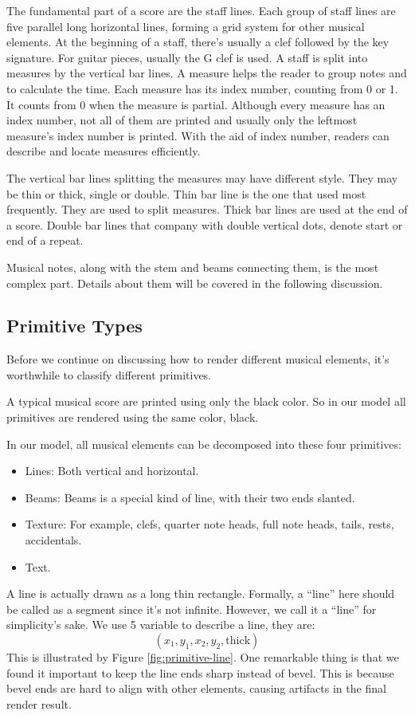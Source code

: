 The fundamental part of a score are the staff lines. Each group of staff lines are five parallel long horizontal lines, forming a grid system for other musical elements. At the beginning of a staff, there's usually a clef followed by the key signature. For guitar pieces, usually the G clef is used. 
A staff is split into measures by the vertical bar lines. A measure helps the reader to group notes and to calculate the time. Each measure has its index number, counting from 0 or 1. It counts from 0 when the measure is partial. Although every measure has an index number, not all of them are printed and usually only the leftmost measure's index number is printed. With the aid of index number, readers can describe and locate measures efficiently. 

The vertical bar lines splitting the measures may have different style. They may be thin or thick, single or double. Thin bar line is the one that used most frequently. They are used to split measures.
 Thick bar lines are used at the end of a score. Double bar lines that company with double vertical dots, denote start or end of a repeat.

 Musical notes, along with the stem and beams connecting them, is the most complex part. Details about them will be covered in the following discussion.

\subsection{Primitive Types}
Before we continue on discussing how to render different musical elements, it's worthwhile to classify different primitives.

A typical musical score are printed using only the black color.
So in our model all primitives are rendered using the same color, black.

In our model, all musical elements can be decomposed into these four primitives:
\begin{itemize}
    \item Lines: Both vertical and horizontal.
    \item Beams: Beams is a special kind of line, with their two ends slanted.
    \item Texture: For example, clefs, quarter note heads, full note heads, tails, rests, accidentals.
    \item Text.
\end{itemize}

A line is actually drawn as a long thin rectangle. Formally, a ``line'' here should be called as a segment since it's not infinite. However, we call it a ``line'' for simplicity's sake.
We use 5 variable to describe a line, they are:
    $$(x_1, y_1, x_2, y_2, \mathrm{thick})$$
This is illustrated by Figure \ref{fig:primitive-line}. One remarkable thing is that we found it important to keep the line ends sharp instead of bevel. This is because bevel ends are hard to align with other elements, causing artifacts in the final render result.

